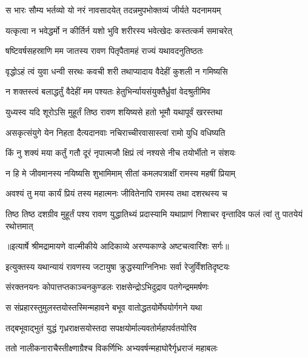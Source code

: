 \twolineshloka
{स भारः सौम्य भर्तव्यो यो नरं नावसादयेत्}
{तदन्नमुपभोक्तव्यं जीर्यते यदनामयम्} %

\twolineshloka
{यत्कृत्वा न भवेद्धर्मो न कीर्तिर्न यशो भुवि}
{शरीरस्य भवेत्खेदः कस्तत्कर्म समाचरेत्} %

\twolineshloka
{षष्टिवर्षसहस्राणि मम जातस्य रावण}
{पितृपैतामहं राज्यं यथावदनुतिष्ठतः} %

\twolineshloka
{वृद्धोऽहं त्वं युवा धन्वी सरथः कवची शरी}
{तथाप्यादाय वैदेहीं कुशली न गमिष्यसि} %

\twolineshloka
{न शक्तस्त्वं बलाद्धर्तुं वैदेहीं मम पश्यतः}
{हेतुभिर्न्यायसंयुक्तैर्ध्रुवां वेदश्रुतीमिव} %

\twolineshloka
{युध्यस्व यदि शूरोऽसि मुहूर्तं तिष्ठ रावण}
{शयिष्यसे हतो भूमौ यथापूर्वं खरस्तथा} %

\twolineshloka
{असकृत्संयुगे येन निहता दैत्यदानवाः}
{नचिराच्चीरवासास्त्वां रामो युधि वधिष्यति} %

\twolineshloka
{किं नु शक्यं मया कर्तुं गतौ दूरं नृपात्मजौ}
{क्षिप्रं त्वं नश्यसे नीच तयोर्भीतो न संशयः} %

\twolineshloka
{न हि मे जीवमानस्य नयिष्यसि शुभामिमाम्}
{सीतां कमलपत्राक्षीं रामस्य महषीं प्रियाम्} %

\twolineshloka
{अवश्यं तु मया कार्यं प्रियं तस्य महात्मनः}
{जीवितेनापि रामस्य तथा दशरथस्य च} %

\threelineshloka
{तिष्ठ तिष्ठ दशग्रीव मुहूर्तं पश्य रावण}
{युद्धातिथ्यं प्रदास्यामि यथाप्राणं निशाचर}
{वृन्तादिव फलं त्वां तु पातयेयं रथोत्तमात्} %


{॥इत्यार्षे श्रीमद्रामायणे वाल्मीकीये आदिकाव्ये अरण्यकाण्डे अष्टचत्वारिंशः सर्गः॥}


\twolineshloka
{इत्युक्तस्य यथान्यायं रावणस्य जटायुषा}
{क्रुद्धस्याग्निनिभाः सर्वा रेजुर्विंशतिदृष्टयः} %

\twolineshloka
{संरक्तनयनः कोपात्तप्तकाञ्चनकुण्डलः}
{राक्षसेन्द्रोऽभिदुद्राव पतगेन्द्रममर्षणः} %

\twolineshloka
{स संप्रहारस्तुमुलस्तयोस्तस्मिन्महावने}
{बभूव वातोद्धतयोर्मेघयोर्गगने यथा} %

\twolineshloka
{तद्बभूवाद्भुतं युद्धं गृध्रराक्षसयोस्तदा}
{सपक्षयोर्माल्यवतोर्महापर्वतयोरिव} %

\twolineshloka
{ततो नालीकनाराचैस्तीक्ष्णाग्रैश्च विकर्णिभिः}
{अभ्यवर्षन्महाघोरैर्गृध्रराजं महाबलः} %

